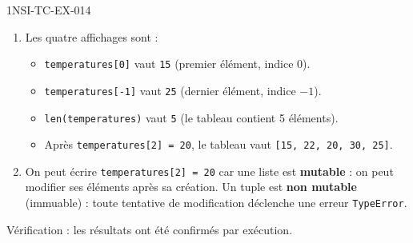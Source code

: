 \begin{corrige}{1NSI-TC-EX-014}
\begin{enumerate}
  \item Les quatre affichages sont :
  \begin{itemize}
    \item \lstinline{temperatures[0]} vaut \lstinline{15} (premier élément, indice 0).
    \item \lstinline{temperatures[-1]} vaut \lstinline{25} (dernier élément, indice $-1$).
    \item \lstinline{len(temperatures)} vaut \lstinline{5} (le tableau contient 5 éléments).
    \item Après \lstinline{temperatures[2] = 20}, le tableau vaut \lstinline{[15, 22, 20, 30, 25]}.
  \end{itemize}

  \item On peut écrire \lstinline{temperatures[2] = 20} car une liste est \textbf{mutable} : on peut modifier ses éléments après sa création. Un tuple est \textbf{non mutable} (immuable) : toute tentative de modification déclenche une erreur \lstinline{TypeError}.
\end{enumerate}

Vérification : les résultats ont été confirmés par exécution.
\end{corrige}
